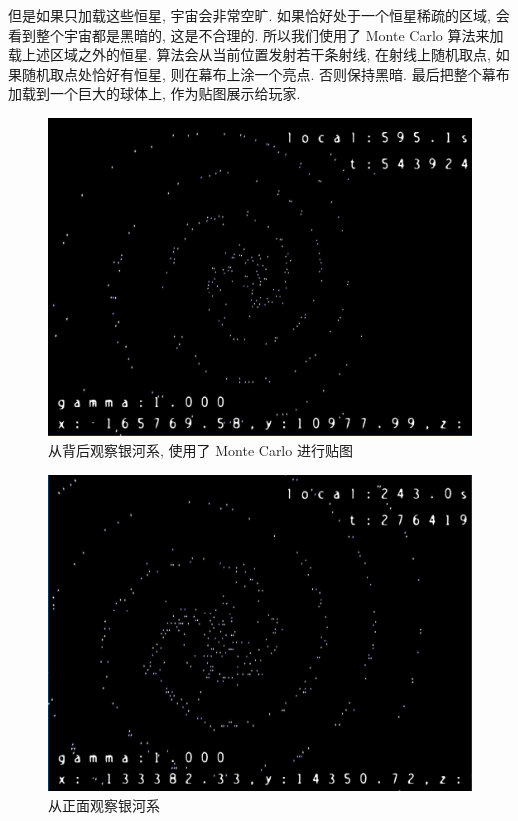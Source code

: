 \documentclass[a4paper,12pt,titlepage]{article}
\begin{document}
	但是如果只加载这些恒星, 宇宙会非常空旷. 如果恰好处于一个恒星稀疏的区域, 会看到整个宇宙都是黑暗的, 这是不合理的. 所以我们使用了 Monte Carlo 算法来加载上述区域之外的恒星. 算法会从当前位置发射若干条射线, 在射线上随机取点, 如果随机取点处恰好有恒星, 则在幕布上涂一个亮点. 否则保持黑暗. 最后把整个幕布加载到一个巨大的球体上, 作为贴图展示给玩家. 
	
\begin{figure}[H]
\centering
	\includegraphics[scale=0.3]{00.png}
	\caption{从背后观察银河系, 使用了 Monte Carlo 进行贴图}
\end{figure}
	
\begin{figure}[H]
\centering
	\includegraphics[scale=0.3]{01.png}
	\caption{从正面观察银河系}
\end{figure}
	
\end{document}
